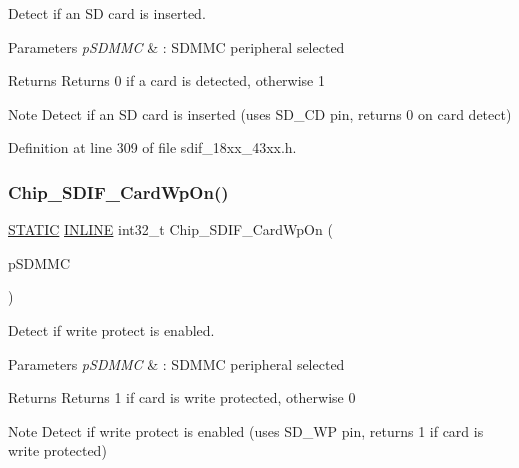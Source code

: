 Detect if an SD card is inserted. 


\begin{DoxyParams}{Parameters}
{\em p\+S\+D\+M\+MC} & \+: S\+D\+M\+MC peripheral selected \\
\hline
\end{DoxyParams}
\begin{DoxyReturn}{Returns}
Returns 0 if a card is detected, otherwise 1 
\end{DoxyReturn}
\begin{DoxyNote}{Note}
Detect if an SD card is inserted (uses S\+D\+\_\+\+CD pin, returns 0 on card detect) 
\end{DoxyNote}


Definition at line 309 of file sdif\+\_\+18xx\+\_\+43xx.\+h.

\mbox{\label{group___s_d_i_f__18_x_x__43_x_x_gabe0627da22e658357f0709ec5a354b74}} 
\subsubsection{\texorpdfstring{Chip\+\_\+\+S\+D\+I\+F\+\_\+\+Card\+Wp\+On()}{Chip\_SDIF\_CardWpOn()}}
{\footnotesize\ttfamily \hyperlink{group___l_p_c___types___public___macros_ga10b2d890d871e1489bb02b7e70d9bdfb}{S\+T\+A\+T\+IC} \hyperlink{spifi__18xx__43xx_8h_a2eb6f9e0395b47b8d5e3eeae4fe0c116}{I\+N\+L\+I\+NE} int32\+\_\+t Chip\+\_\+\+S\+D\+I\+F\+\_\+\+Card\+Wp\+On (\begin{DoxyParamCaption}\item[{\hyperlink{struct_l_p_c___s_d_m_m_c___t}{L\+P\+C\+\_\+\+S\+D\+M\+M\+C\+\_\+T} $\ast$}]{p\+S\+D\+M\+MC }\end{DoxyParamCaption})}



Detect if write protect is enabled. 


\begin{DoxyParams}{Parameters}
{\em p\+S\+D\+M\+MC} & \+: S\+D\+M\+MC peripheral selected \\
\hline
\end{DoxyParams}
\begin{DoxyReturn}{Returns}
Returns 1 if card is write protected, otherwise 0 
\end{DoxyReturn}
\begin{DoxyNote}{Note}
Detect if write protect is enabled (uses S\+D\+\_\+\+WP pin, returns 1 if card is write protected) 
\end{DoxyNote}


